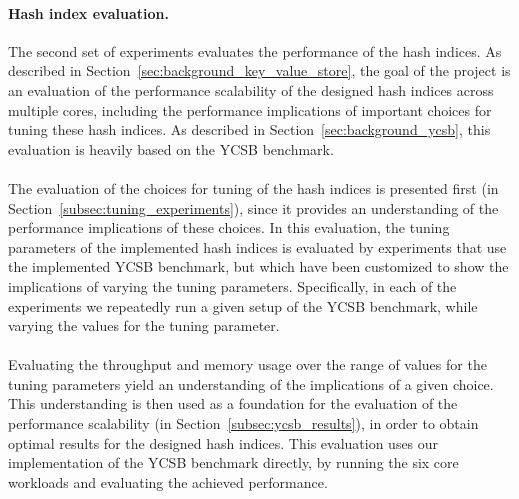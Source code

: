 \documentclass[11pt]{report} %
\begin{document}
\paragraph{Hash index evaluation.} 
The second set of experiments evaluates the performance of the hash indices. As described in Section~\ref{sec:background_key_value_store}, the goal of the project is an evaluation of the performance scalability of the designed hash indices across multiple cores, including the performance implications of important choices for tuning these hash indices. As described in Section~\ref{sec:background_ycsb}, this evaluation is heavily based on the YCSB benchmark.\\
\\
The evaluation of the choices for tuning of the hash indices is presented first (in Section~\ref{subsec:tuning_experiments}), since it provides an understanding of the performance implications of these choices. In this evaluation, the tuning parameters of the implemented hash indices is evaluated by experiments that use the implemented YCSB benchmark, but which have been customized to show the implications of varying the tuning parameters. Specifically, in each of the experiments we repeatedly run a given setup of the YCSB benchmark, while varying the values for the tuning parameter. \\
\\
Evaluating the throughput and memory usage over the range of values for the tuning parameters yield an understanding of the implications of a given choice. This understanding is then used as a foundation for the evaluation of the performance scalability (in Section~\ref{subsec:ycsb_results}), in order to obtain optimal results for the designed hash indices. This evaluation uses our implementation of the YCSB benchmark directly, by running the six core workloads and evaluating the achieved performance.
\end{document}
